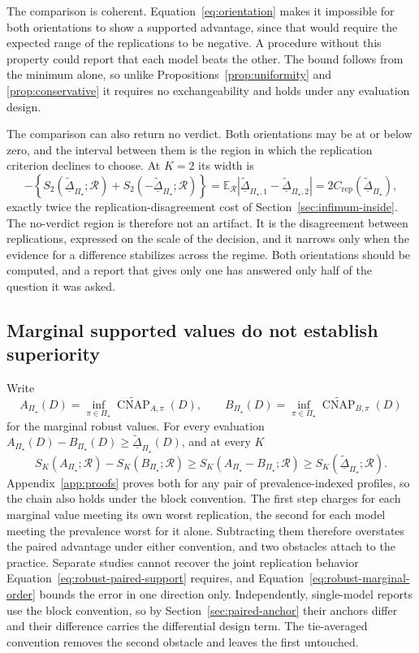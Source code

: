 \documentclass[11pt]{article}
\newcommand{\CNAP}{\operatorname{CNAP}}
\newcommand{\Regime}{\mathcal{R}}
\newcommand{\PSet}{\Pi_\star}
\newcommand{\E}{\mathbb{E}}
\newcommand{\CNAPta}{\widetilde{\CNAP}}
\newcommand{\RobDta}{\underline{\widetilde{\Delta}}_{\PSet}}
\theoremstyle{remark}
\begin{document}
The comparison is coherent. Equation~\eqref{eq:orientation} makes it impossible for both orientations to show a supported advantage, since that would require the expected range of the replications to be negative. A procedure without this property could report that each model beats the other. The bound follows from the minimum alone, so unlike Propositions~\ref{prop:uniformity} and \ref{prop:conservative} it requires no exchangeability and holds under any evaluation design.

The comparison can also return no verdict. Both orientations may be at or below zero, and the interval between them is the region in which the replication criterion declines to choose. At $K=2$ its width is
\[
-\left\{
S_2(\RobDta;\Regime)+S_2(-\RobDta;\Regime)
\right\}
=
\E_{\Regime}
\left|
\underline{\widetilde{\Delta}}_{\PSet,1}-\underline{\widetilde{\Delta}}_{\PSet,2}
\right|
=
2C_{\mathrm{rep}}(\RobDta),
\]
exactly twice the replication-disagreement cost of Section~\ref{sec:infimum-inside}. The no-verdict region is therefore not an artifact. It is the disagreement between replications, expressed on the scale of the decision, and it narrows only when the evidence for a difference stabilizes across the regime. Both orientations should be computed, and a report that gives only one has answered only half of the question it was asked.

\subsection{Marginal supported values do not establish superiority}

Write
\[
A_{\PSet}(D)
=
\inf_{\pi\in\PSet}\CNAPta_{A,\pi}(D),
\qquad
B_{\PSet}(D)
=
\inf_{\pi\in\PSet}\CNAPta_{B,\pi}(D)
\]
for the marginal robust values. For every evaluation $A_{\PSet}(D)-B_{\PSet}(D)\geq\RobDta(D)$, and at every $K$
\begin{equation}
S_K(A_{\PSet};\Regime)
-
S_K(B_{\PSet};\Regime)
\geq
S_K(A_{\PSet}-B_{\PSet};\Regime)
\geq
S_K(\RobDta;\Regime).
\label{eq:robust-marginal-order}
\end{equation}
Appendix~\ref{app:proofs} proves both for any pair of prevalence-indexed profiles, so the chain also holds under the block convention. The first step charges for each marginal value meeting its own worst replication, the second for each model meeting the prevalence worst for it alone. Subtracting them therefore overstates the paired advantage under either convention, and two obstacles attach to the practice. Separate studies cannot recover the joint replication behavior Equation~\eqref{eq:robust-paired-support} requires, and Equation~\eqref{eq:robust-marginal-order} bounds the error in one direction only. Independently, single-model reports use the block convention, so by Section~\ref{sec:paired-anchor} their anchors differ and their difference carries the differential design term. The tie-averaged convention removes the second obstacle and leaves the first untouched.
\end{document}
